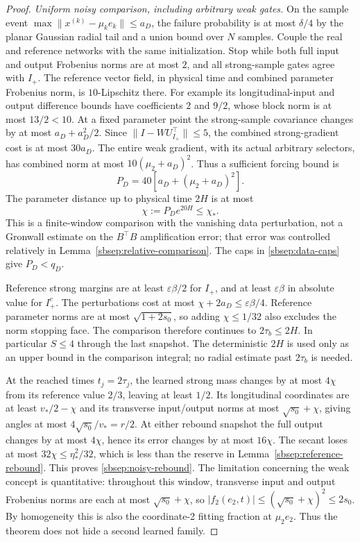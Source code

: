 \documentclass{article} %
\theoremstyle{plain}
\theoremstyle{definition}
\theoremstyle{remark}
\begin{document}
\begin{proof}
\emph{Uniform noisy comparison, including arbitrary weak gates.}
On the sample event $\max\|x^{(k)}-\mu_ke_k\|\le a_D$, the failure
probability is at most $\delta/4$ by the planar Gaussian radial tail
and a union bound over $N$ samples. Couple the real and reference
networks with the same initialization. Stop while both full input and
output Frobenius norms are at most $2$, and all strong-sample gates
agree with $I_+$. The reference vector field, in physical time and
combined parameter Frobenius norm, is $10$-Lipschitz there.
For example its longitudinal-input and output difference bounds have
coefficients $2$ and $9/2$, whose block norm is at most $13/2<10$.
At a fixed parameter point the strong-sample covariance changes by at
most $a_D+a_D^2/2$. Since $\|I-WU_{I_+}^\top\|\le5$, the combined
strong-gradient cost is at most $30a_D$. The entire weak gradient,
with its actual arbitrary selectors, has combined norm at most
$10(\mu_2+a_D)^2$. Thus a sufficient forcing bound is
\[
 P_D=40[a_D+(\mu_2+a_D)^2].
\]
The parameter distance up to physical time $2H$ is at most
\begin{equation}\label{sbsep:noisy-distance}
 \chi:=P_De^{20H}\le\chi_*.
\end{equation}
This is a finite-window comparison with the vanishing data perturbation,
not a Gronwall estimate on the $B^\top B$ amplification error; that error
was controlled relatively in Lemma~\ref{sbsep:relative-comparison}.
The caps in \eqref{sbsep:data-caps} give $P_D<q_D$.

Reference strong margins are at least $\varepsilon\beta/2$ for $I_+$,
and at least $\varepsilon\beta$ in absolute value for $I_+^c$.
The perturbations cost at most $\chi+2a_D\le\varepsilon\beta/4$.
Reference parameter norms are at most $\sqrt{1+2s_0}$, so adding
$\chi\le1/32$ also excludes the norm stopping face. The comparison
therefore continues to $2\tau_b\le2H$. In particular $S\le4$
through the last snapshot. The deterministic $2H$ is used only as an
upper bound in the comparison integral; no radial estimate past
$2\tau_b$ is needed.

At the reached times $t_j=2\tau_j$, the learned strong mass changes
by at most $4\chi$ from its reference value $2/3$, leaving at least
$1/2$. Its longitudinal coordinates are at least $v_*/2-\chi$ and its
transverse input/output norms at most $\sqrt{s_0}+\chi$, giving angles
at most $4\sqrt{s_0}/v_*=r/2$. At either rebound snapshot the full
output changes by at most $4\chi$, hence its error changes by at most
$16\chi$. The secant loses at most $32\chi\le\eta_*^2/32$, which is
less than the reserve in Lemma~\ref{sbsep:reference-rebound}.
This proves \eqref{sbsep:noisy-rebound}.
The limitation concerning the weak concept is quantitative: throughout this
window, transverse input and output Frobenius norms are each at most
$\sqrt{s_0}+\chi$, so
$|f_2(e_2,t)|\le(\sqrt{s_0}+\chi)^2\le2s_0$.
By homogeneity this is also the coordinate-2 fitting fraction at
$\mu_2e_2$. Thus the theorem does not hide a second learned family.


\end{proof}
\end{document}
